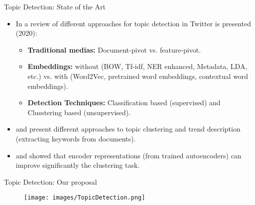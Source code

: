\documentclass[aspectratio=169]{beamer}
\begin{document}
\begin{frame}{Topic Detection: State of the Art}

\begin{itemize}
    \item In \cite{ReviewApproachesTopcicDetection} a review of different approaches for topic detection in Twitter is presented (2020):
    \begin{itemize}
        \item \textbf{Traditional medias:} Document-pivot vs. feature-pivot.
        
        \item \textbf{Embeddings:} without (BOW, Tf-idf, NER enhanced, Metadata, LDA, etc.) vs. with (Word2Vec, pretrained word embeddings, contextual word embeddings).
        
        \item \textbf{Detection Techniques:} Classification based (supervised) and Clusstering based (unsupervised).
    \end{itemize}
    
\item \cite{TrendTopicsDetectionFromTwitter} and \cite{FuzzyIncrementalTopicDetection} present different approaches to topic clustering and trend description (extracting keywords from documents).
    
\item  \cite{DeepRepresentationClusteringTweets} and \cite{UnsupervisedDeepEmbeddingClustering} showed that encoder representations (from trained autoencoders) can improve significantly the clustering task.
\end{itemize}

\end{frame}

\begin{frame}{Topic Detection: Our proposal}

\begin{figure}
    \centering
   \texttt{[image: images/TopicDetection.png]}
\end{figure}

\end{frame}


    
    
\end{document}
